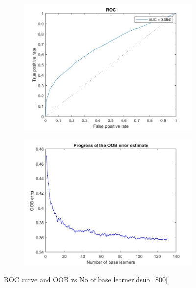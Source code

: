 \begin{figure}[H]
    \begin{subfigure}[b]{0.5\textwidth}
        \includegraphics[width=\textwidth]{img/800/rocgray.jpg}
    \end{subfigure}
    \hfill
    \begin{subfigure}[b]{0.5\textwidth}
        \includegraphics[width=\textwidth]{img/800/saturategray.jpg}
    \end{subfigure}
    \caption{ROC curve and OOB vs No of base learner[dsub=800]}
\end{figure}
